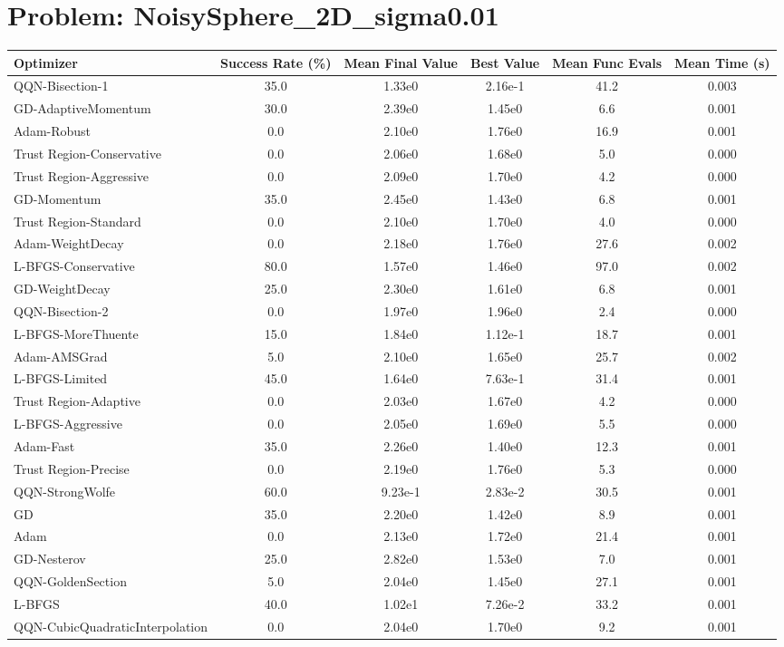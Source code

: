 \documentclass{article}
\begin{document}
\section{Problem: NoisySphere\_2D\_sigma0.01}
\begin{longtable}{p{3cm}*{5}{c}}
\toprule
\textbf{Optimizer} & \textbf{Success Rate (\%)} & \textbf{Mean Final Value} & \textbf{Best Value} & \textbf{Mean Func Evals} & \textbf{Mean Time (s)} \\
\midrule
QQN-Bisection-1 & 35.0 & 1.33e0 & 2.16e-1 & 41.2 & 0.003 \\
GD-AdaptiveMomentum & 30.0 & 2.39e0 & 1.45e0 & 6.6 & 0.001 \\
Adam-Robust & 0.0 & 2.10e0 & 1.76e0 & 16.9 & 0.001 \\
Trust Region-Conservative & 0.0 & 2.06e0 & 1.68e0 & 5.0 & 0.000 \\
Trust Region-Aggressive & 0.0 & 2.09e0 & 1.70e0 & 4.2 & 0.000 \\
GD-Momentum & 35.0 & 2.45e0 & 1.43e0 & 6.8 & 0.001 \\
Trust Region-Standard & 0.0 & 2.10e0 & 1.70e0 & 4.0 & 0.000 \\
Adam-WeightDecay & 0.0 & 2.18e0 & 1.76e0 & 27.6 & 0.002 \\
L-BFGS-Conservative & 80.0 & 1.57e0 & 1.46e0 & 97.0 & 0.002 \\
GD-WeightDecay & 25.0 & 2.30e0 & 1.61e0 & 6.8 & 0.001 \\
QQN-Bisection-2 & 0.0 & 1.97e0 & 1.96e0 & 2.4 & 0.000 \\
L-BFGS-MoreThuente & 15.0 & 1.84e0 & 1.12e-1 & 18.7 & 0.001 \\
Adam-AMSGrad & 5.0 & 2.10e0 & 1.65e0 & 25.7 & 0.002 \\
L-BFGS-Limited & 45.0 & 1.64e0 & 7.63e-1 & 31.4 & 0.001 \\
Trust Region-Adaptive & 0.0 & 2.03e0 & 1.67e0 & 4.2 & 0.000 \\
L-BFGS-Aggressive & 0.0 & 2.05e0 & 1.69e0 & 5.5 & 0.000 \\
Adam-Fast & 35.0 & 2.26e0 & 1.40e0 & 12.3 & 0.001 \\
Trust Region-Precise & 0.0 & 2.19e0 & 1.76e0 & 5.3 & 0.000 \\
QQN-StrongWolfe & 60.0 & 9.23e-1 & 2.83e-2 & 30.5 & 0.001 \\
GD & 35.0 & 2.20e0 & 1.42e0 & 8.9 & 0.001 \\
Adam & 0.0 & 2.13e0 & 1.72e0 & 21.4 & 0.001 \\
GD-Nesterov & 25.0 & 2.82e0 & 1.53e0 & 7.0 & 0.001 \\
QQN-GoldenSection & 5.0 & 2.04e0 & 1.45e0 & 27.1 & 0.001 \\
L-BFGS & 40.0 & 1.02e1 & 7.26e-2 & 33.2 & 0.001 \\
QQN-CubicQuadraticInterpolation & 0.0 & 2.04e0 & 1.70e0 & 9.2 & 0.001 \\
\bottomrule
\end{longtable}
\end{document}
